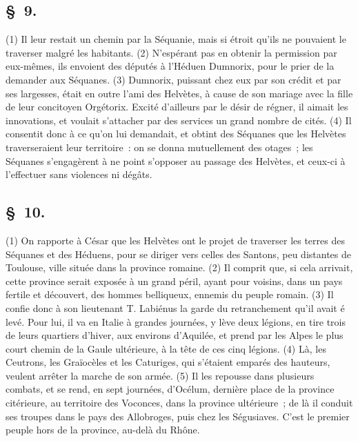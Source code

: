 \documentclass[french,twoside]{book} %
\begin{document}
\subsection[{§ 9.}]{ \textsc{§ 9.} }
\noindent (1) Il leur restait un chemin par la Séquanie, mais si étroit qu’ils ne pouvaient le traverser malgré les habitants. (2) N'espérant pas en obtenir la permission par eux-mêmes, ils envoient des députés à l’Héduen Dumnorix, pour le prier de la demander aux Séquanes. (3) Dumnorix, puissant chez eux par son crédit et par ses largesses, était en outre l’ami des Helvètes, à cause de son mariage avec la fille de leur concitoyen Orgétorix. Excité d’ailleurs par le désir de régner, il aimait les innovations, et voulait s’attacher par des services un grand nombre de cités. (4) Il consentit donc à ce qu’on lui demandait, et obtint des Séquanes que les Helvètes traverseraient leur territoire : on se donna mutuellement des otages ; les Séquanes s’engagèrent à ne point s’opposer au passage des Helvètes, et ceux-ci à l’effectuer sans violences ni dégâts.
\subsection[{§ 10.}]{ \textsc{§ 10.} }
\noindent (1) On rapporte à César que les Helvètes ont le projet de traverser les terres des Séquanes et des Héduens, pour se diriger vers celles des Santons, peu distantes de Toulouse, ville située dans la province romaine. (2) Il comprit que, si cela arrivait, cette province serait exposée à un grand péril, ayant pour voisins, dans un pays fertile et découvert, des hommes belliqueux, ennemis du peuple romain. (3) Il confie donc à son lieutenant T. Labiénus la garde du retranchement qu’il avait é levé. Pour lui, il va en Italie à grandes journées, y lève deux légions, en tire trois de leurs quartiers d’hiver, aux environs d’Aquilée, et prend par les Alpes le plus court chemin de la Gaule ultérieure, à la tête de ces cinq légions. (4) Là, les Ceutrons, les Graïocèles et les Caturiges, qui s’étaient emparés des hauteurs, veulent arrêter la marche de son armée. (5) Il les repousse dans plusieurs combats, et se rend, en sept journées, d’Océlum, dernière place de la province citérieure, au territoire des Voconces, dans la province ultérieure ; de là il conduit ses troupes dans le pays des Allobroges, puis chez les Ségusiaves. C'est le premier peuple hors de la province, au-delà du Rhône.
\end{document}
